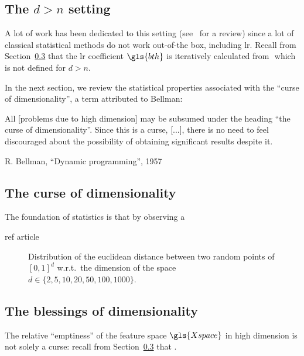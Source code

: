 \subsection{The $d > n$ setting}

A lot of work has been dedicated to this setting (see~\cite{} for a review) since a lot of classical statistical methods do not work out-of-the box, including \gls{lr}. Recall from Section~\ref{} that the \gls{lr} coefficient $\gls{bth}$ is iteratively calculated from $ $ which is not defined for $d > n$.

In the next section, we review the statistical properties associated with the ``curse of dimensionality'', a term attributed to Bellman:
\epigraph{All [problems due to high dimension] may be subsumed under the heading “the curse of dimensionality”. Since this is a curse, [...], there is no need to feel discouraged about the possibility of obtaining significant results despite it.}{R. Bellman, ``Dynamic programming'', 1957}

\subsection{The curse of dimensionality}

The foundation of statistics is that by observing a 

ref article


\begin{figure}[!ht]
\centering
\resizebox{\textwidth}{!}{}
\caption{Distribution of the euclidean distance between two random points of $[0,1]^d$ w.r.t.\ the dimension of the space $d \in \{ 2, 5, 10, 20, 50, 100, 1000 \}$.}
\label{fig:distance}
\end{figure}

\subsection{The blessings of dimensionality}

The relative ``emptiness'' of the feature space $\gls{Xspace}$ in high dimension is not solely a curse: recall from Section~\ref{} that .

